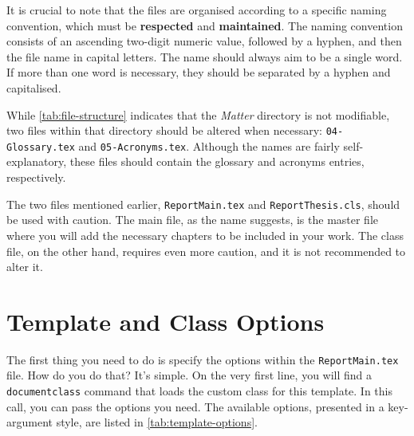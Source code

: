 It is crucial to note that the files are organised according to a specific naming convention, which must be \textbf{respected} and \textbf{maintained}. The naming convention consists of an ascending two-digit numeric value, followed by a hyphen, and then the file name in capital letters. The name should always aim to be a single word. If more than one word is necessary, they should be separated by a hyphen and capitalised.

\begin{block}[note]
While \autoref{tab:file-structure} indicates that the \textit{Matter} directory is not modifiable, two files within that directory should be altered when necessary: \texttt{04-Glossary.tex} and \texttt{05-Acronyms.tex}. Although the names are fairly self-explanatory, these files should contain the glossary and acronyms entries, respectively.
\end{block}

The two files mentioned earlier, \texttt{ReportMain.tex} and \texttt{ReportThesis.cls}, should be used with caution. The main file, as the name suggests, is the master file where you will add the necessary chapters to be included in your work. The class file, on the other hand, requires even more caution, and it is not recommended to alter it.

\section{Template and Class Options}
\label{sec:class-options}
The first thing you need to do is specify the options within the \texttt{ReportMain.tex} file. How do you do that? It's simple. On the very first line, you will find a \texttt{documentclass} command that loads the custom class for this template. In this call, you can pass the options you need. The available options, presented in a key-argument style, are listed in \autoref{tab:template-options}.

